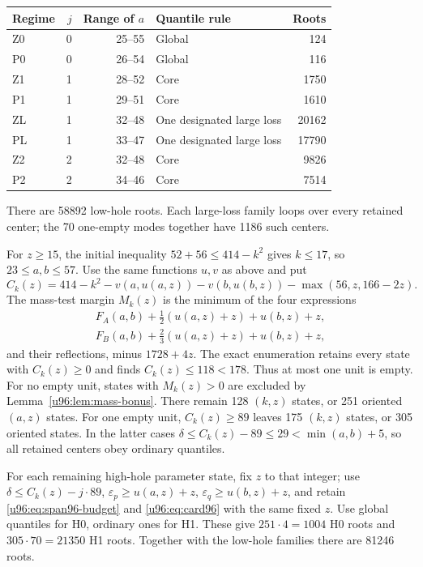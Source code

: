 \documentclass[11pt,a4paper]{article}
\theoremstyle{remark}
\begin{document}
\begin{center}\small
\begin{tabular}{lrrlr}
\toprule
Regime&$j$&Range of $a$&Quantile rule&Roots\\\midrule
Z0&0&25--55&Global&124\\
P0&0&26--54&Global&116\\
Z1&1&28--52&Core&1750\\
P1&1&29--51&Core&1610\\
ZL&1&32--48&One designated large loss&20162\\
PL&1&33--47&One designated large loss&17790\\
Z2&2&32--48&Core&9826\\
P2&2&34--46&Core&7514\\\bottomrule
\end{tabular}
\end{center}
There are 58892 low-hole roots. Each large-loss family loops over every
retained center; the 70 one-empty modes together have 1186 such centers.

For $z\geq15$, the initial inequality $52+56\leq414-k^2$ gives $k\leq17$,
so $23\leq a,b\leq57$. Use the same functions $u,v$ as above and put
\[
 C_k(z)=414-k^2-v(a,u(a,z))-v(b,u(b,z))
                                  -\max(56,z,166-2z).
\]
The mass-test margin $M_k(z)$ is the minimum of the four expressions
\[
 \begin{split}
 F_A(a,b)+\tfrac12(u(a,z)+z)+u(b,z)+z,\\
 F_B(a,b)+\tfrac23(u(a,z)+z)+u(b,z)+z,
 \end{split}
\]
and their reflections, minus $1728+4z$.
The exact enumeration retains every state with $C_k(z)\geq0$ and finds
$C_k(z)\leq118<178$. Thus at most one unit is empty.
For no empty unit, states with $M_k(z)>0$ are excluded by
Lemma~\ref{u96:lem:mass-bonus}. There remain 128 $(k,z)$ states, or 251
oriented $(a,z)$ states. For one empty unit, $C_k(z)\geq89$ leaves
175 $(k,z)$ states, or 305 oriented states. In the latter cases
$\delta\leq C_k(z)-89\leq29<\min(a,b)+5$, so all retained centers obey
ordinary quantiles.

For each remaining high-hole parameter state, fix $z$ to that integer;
use $\delta\leq C_k(z)-j\cdot89$,
$\varepsilon_p\geq u(a,z)+z$, $\varepsilon_q\geq u(b,z)+z$, and retain
\eqref{u96:eq:span96-budget} and \eqref{u96:eq:card96} with the same fixed $z$.
Use global quantiles for H0, ordinary ones for H1. These give
$251\cdot4=1004$ H0 roots and $305\cdot70=21350$ H1 roots.
Together with the low-hole families there are 81246 roots.
\end{document}
